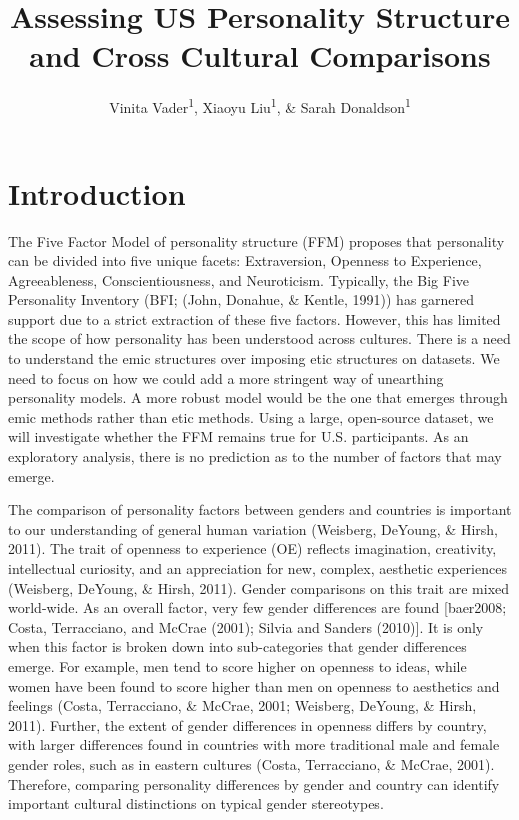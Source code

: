 \documentclass[
  english,
  man, fleqn, noextraspace]{apa6}
\title{Assessing US Personality Structure and Cross Cultural Comparisons}
\author{Vinita Vader\textsuperscript{1}, Xiaoyu Liu\textsuperscript{1}, \& Sarah Donaldson\textsuperscript{1}}
\date{}
\affiliation{\vspace{0.5cm}\textsuperscript{1} University of Oregon}
\begin{document}
\maketitle

\hypertarget{introduction}{%
\section{Introduction}\label{introduction}}

The Five Factor Model of personality structure (FFM) proposes that personality can be divided into five unique facets: Extraversion, Openness to Experience, Agreeableness, Conscientiousness, and Neuroticism. Typically, the Big Five Personality Inventory (BFI; (John, Donahue, \& Kentle, 1991)) has garnered support due to a strict extraction of these five factors. However, this has limited the scope of how personality has been understood across cultures. There is a need to understand the emic structures over imposing etic structures on datasets. We need to focus on how we could add a more stringent way of unearthing personality models. A more robust model would be the one that emerges through emic methods rather than etic methods. Using a large, open-source dataset, we will investigate whether the FFM remains true for U.S. participants. As an exploratory analysis, there is no prediction as to the number of factors that may emerge.

The comparison of personality factors between genders and countries is important to our understanding of general human variation (Weisberg, DeYoung, \& Hirsh, 2011). The trait of openness to experience (OE) reflects imagination, creativity, intellectual curiosity, and an appreciation for new, complex, aesthetic experiences (Weisberg, DeYoung, \& Hirsh, 2011). Gender comparisons on this trait are mixed world-wide. As an overall factor, very few gender differences are found {[}baer2008; Costa, Terracciano, and McCrae (2001); Silvia and Sanders (2010){]}. It is only when this factor is broken down into sub-categories that gender differences emerge. For example, men tend to score higher on openness to ideas, while women have been found to score higher than men on openness to aesthetics and feelings (Costa, Terracciano, \& McCrae, 2001; Weisberg, DeYoung, \& Hirsh, 2011). Further, the extent of gender differences in openness differs by country, with larger differences found in countries with more traditional male and female gender roles, such as in eastern cultures (Costa, Terracciano, \& McCrae, 2001). Therefore, comparing personality differences by gender and country can identify important cultural distinctions on typical gender stereotypes.
\end{document}
